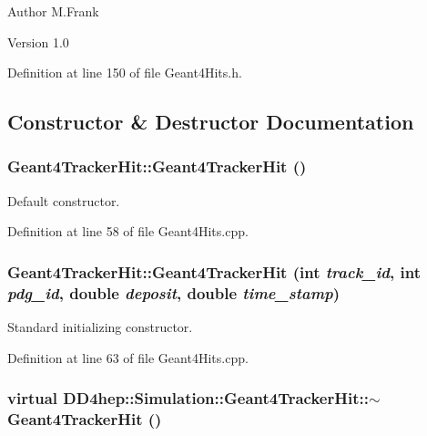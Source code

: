 \begin{DoxyAuthor}{Author}
M.Frank 
\end{DoxyAuthor}
\begin{DoxyVersion}{Version}
1.0 
\end{DoxyVersion}


Definition at line 150 of file Geant4Hits.h.

\subsection{Constructor \& Destructor Documentation}
\hypertarget{class_d_d4hep_1_1_simulation_1_1_geant4_tracker_hit_a7642c87408d8d1fc386b297c351747ad}{
\subsubsection[{Geant4TrackerHit}]{\setlength{\rightskip}{0pt plus 5cm}Geant4TrackerHit::Geant4TrackerHit ()}}
\label{class_d_d4hep_1_1_simulation_1_1_geant4_tracker_hit_a7642c87408d8d1fc386b297c351747ad}


Default constructor. 

Definition at line 58 of file Geant4Hits.cpp.\hypertarget{class_d_d4hep_1_1_simulation_1_1_geant4_tracker_hit_a0c4153d51119c6b58e6318ff7d9a9a1b}{
\subsubsection[{Geant4TrackerHit}]{\setlength{\rightskip}{0pt plus 5cm}Geant4TrackerHit::Geant4TrackerHit (int {\em track\_\-id}, \/  int {\em pdg\_\-id}, \/  double {\em deposit}, \/  double {\em time\_\-stamp})}}
\label{class_d_d4hep_1_1_simulation_1_1_geant4_tracker_hit_a0c4153d51119c6b58e6318ff7d9a9a1b}


Standard initializing constructor. 

Definition at line 63 of file Geant4Hits.cpp.\hypertarget{class_d_d4hep_1_1_simulation_1_1_geant4_tracker_hit_a4f4febb374cab1cb2e8a0463b84c165e}{
\subsubsection[{$\sim$Geant4TrackerHit}]{\setlength{\rightskip}{0pt plus 5cm}virtual DD4hep::Simulation::Geant4TrackerHit::$\sim$Geant4TrackerHit ()}}
\label{class_d_d4hep_1_1_simulation_1_1_geant4_tracker_hit_a4f4febb374cab1cb2e8a0463b84c165e}


